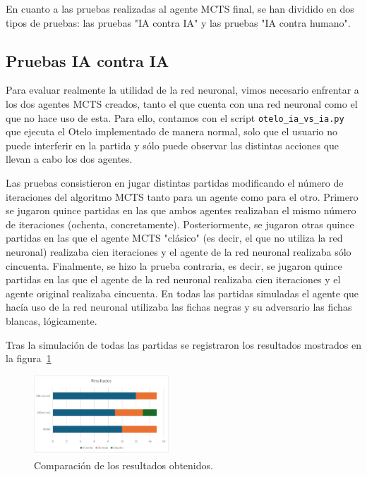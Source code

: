 \documentclass[conference]{IEEEtran}
\begin{document}
En cuanto a las pruebas realizadas al agente MCTS final, se han dividido en dos tipos de pruebas: las pruebas "IA contra IA" y las pruebas "IA contra humano".

\subsection{Pruebas IA contra IA}
Para evaluar realmente la utilidad de la red neuronal, vimos necesario enfrentar a los dos agentes MCTS creados, tanto el que cuenta con una red neuronal como el que no hace uso de esta. Para ello, contamos con el script \texttt{otelo\_ia\_vs\_ia.py} que ejecuta el Otelo implementado de manera normal, solo que el usuario no puede interferir en la partida y sólo puede observar las distintas acciones que llevan a cabo los dos agentes.

Las pruebas consistieron en jugar distintas partidas modificando el número de iteraciones del algoritmo MCTS tanto para un agente como para el otro. Primero se jugaron quince partidas en las que ambos agentes realizaban el mismo número de iteraciones (ochenta, concretamente). Posteriormente, se jugaron otras quince partidas en las que el agente MCTS "clásico" (es decir, el que no utiliza la red neuronal) realizaba cien iteraciones y el agente de la red neuronal realizaba sólo cincuenta. Finalmente, se hizo la prueba contraria, es decir, se jugaron quince partidas en las que el agente de la red neuronal realizaba cien iteraciones y el agente original realizaba cincuenta. En todas las partidas simuladas el agente que hacía uso de la red neuronal utilizaba las fichas negras y su adversario las fichas blancas, lógicamente.

Tras la simulación de todas las partidas se registraron los resultados mostrados en la figura~\ref{fig:resultados}

\begin{figure}[htbp]
    \centering
    \includegraphics[width=0.45\textwidth]{grafico_resultados.png}
    \caption{Comparación de los resultados obtenidos.}
    \label{fig:resultados}
\end{figure}
\end{document}
